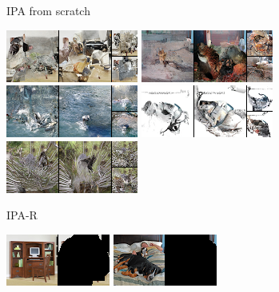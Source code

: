 \begin{figure}[t]
\begin{subfigure}[t]{0.2\textwidth}
      \caption{\scriptsize IPA from scratch}
    \end{subfigure}
    \begin{subfigure}[t]{0.2\textwidth}
      \centering
      \includegraphics[height=\imagenetimgheight]{figs/cigcvae/image-samples/imagenet64/freeform_aipo-r_0_samples.png}
      \includegraphics[height=\imagenetimgheight]{figs/cigcvae/image-samples/imagenet64/freeform_aipo-r_1_samples.png}
      \includegraphics[height=\imagenetimgheight]{figs/cigcvae/image-samples/imagenet64/freeform_aipo-r_2_samples.png}
      \includegraphics[height=\imagenetimgheight]{figs/cigcvae/image-samples/imagenet64/freeform_aipo-r_3_samples.png}
      \includegraphics[height=\imagenetimgheight]{figs/cigcvae/image-samples/imagenet64/freeform_aipo-r_4_samples.png}
      \caption{\scriptsize IPA-R}
    \end{subfigure}
    \begin{subfigure}[t]{0.15\textwidth}
      \centering
      \includegraphics[height=\imagenetimgheight]{figs/cigcvae/image-samples/imagenet64/freeform_aipo_0_gt_masked.png}
      \includegraphics[height=\imagenetimgheight]{figs/cigcvae/image-samples/imagenet64/freeform_aipo_1_gt_masked.png}

\end{subfigure}
\end{figure}
